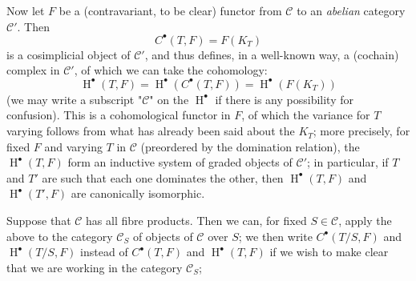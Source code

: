   Now let \(F\) be a (contravariant, to be clear) functor from \(\mathcal {C}\) to an \emph{abelian} category \(\mathcal {C}'\).
  Then
  \[     C^\bullet (T,F) = F(K_T)   \]
  is a cosimplicial object of \(\mathcal {C}'\), and thus defines, in a well-known way, a (cochain) complex in \(\mathcal {C}'\), of which we can take the cohomology:
  \[     \operatorname {H}^\bullet (T,F)     = \operatorname {H}^\bullet (C^\bullet (T,F))     = \operatorname {H}^\bullet (F(K_T))   \]
  (we may write a subscript "\(\mathcal {C}\)" on the \(\operatorname {H}^\bullet \) if there is any possibility for confusion).
  This is a cohomological functor in \(F\), of which the variance for \(T\) varying follows from what has already been said about the \(K_T\);
  more precisely, for fixed \(F\) and varying \(T\) in \(\mathcal {C}\) (preordered by the domination relation), the \(\operatorname {H}^\bullet (T,F)\) form an inductive system of graded objects of \(\mathcal {C}'\);
  in particular, if \(T\) and \(T'\) are such that each one dominates the other, then \(\operatorname {H}^\bullet (T,F)\) and \(\operatorname {H}^\bullet (T',F)\) are canonically isomorphic.\par{}Suppose that \(\mathcal {C}\) has all fibre products.
  Then we can, for fixed \(S\in \mathcal {C}\), apply the above to the category \(\mathcal {C}_S\) of objects of \(\mathcal {C}\) over \(S\);
  we then write \(C^\bullet (T/S,F)\) and \(\operatorname {H}^\bullet (T/S,F)\) instead of \(C^\bullet (T,F)\) and \(\operatorname {H}^\bullet (T,F)\) if we wish to make clear that we are working in the category \(\mathcal {C}_S\);
  
